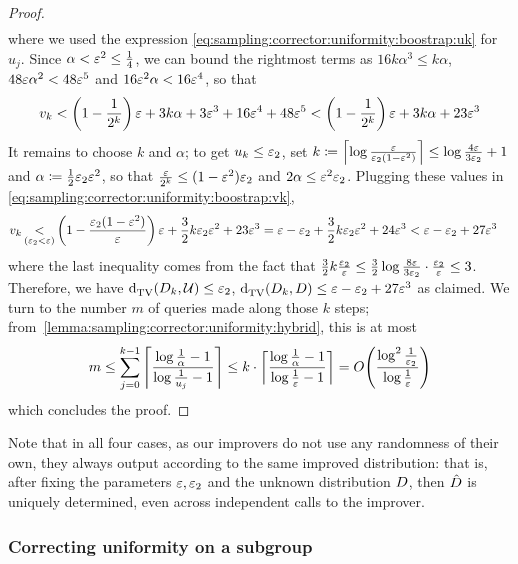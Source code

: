 \begin{proof}
\begin{align*}
\end{align*}
where we used the expression \eqref{eq:sampling:corrector:uniformity:boostrap:uk} for $u_j$. Since $\alpha < \varepsilon^2 \leq \frac{1}{4}$, we can bound the rightmost terms as $16k\alpha^3 \leq k\alpha$, $48\varepsilon\alpha^2<48\varepsilon^5$ and $16\varepsilon^2\alpha < 16\varepsilon^4$, so that 
\begin{equation}\label{eq:sampling:corrector:uniformity:boostrap:vk}
  v_k < \left( 1-\frac{1}{2^k} \right)\varepsilon + 3k\alpha + 3\varepsilon^3+16\varepsilon^4+48\varepsilon^5 < \left( 1-\frac{1}{2^k} \right)\varepsilon + 3k\alpha + 23\varepsilon^3
\end{equation}
It remains to choose $k$ and $\alpha$; to get $u_k \leq \varepsilon_2$, set $k\coloneqq\left\lceil \log\frac{\varepsilon}{\varepsilon_2(1-\varepsilon^2)} \right\rceil\leq \log\frac{4\varepsilon}{3\varepsilon_2}+1$ and $\alpha\coloneqq\frac{1}{2}\varepsilon_2\varepsilon^2$, so that $\frac{\varepsilon}{2^k}\leq (1-\varepsilon^2)\varepsilon_2$ and $2\alpha \leq \varepsilon^2\varepsilon_2$. Plugging these values in \eqref{eq:sampling:corrector:uniformity:boostrap:vk},
\begin{align*}
  v_k &\operatorname*{<}_{(\varepsilon_2<\varepsilon)} \left( 1-\frac{\varepsilon_2(1-\varepsilon^2)}{\varepsilon} \right)\varepsilon + \frac{3}{2}k\varepsilon_2\varepsilon^2 + 23\varepsilon^3 
    = \varepsilon - \varepsilon_2 + \frac{3}{2}k\varepsilon_2\varepsilon^2 + 24\varepsilon^3 
    < \varepsilon - \varepsilon_2 + 27\varepsilon^3
\end{align*}
where the last inequality comes from the fact that $\frac{3}{2}k\frac{\varepsilon_2}{\varepsilon} \leq \frac{3}{2}\log\frac{8\varepsilon}{3\varepsilon_2}\cdot\frac{\varepsilon_2}{\varepsilon}\leq 3$.
Therefore, we have ${\operatorname{d}_{\textrm{TV}}^{}\!\left({D_k, \mathcal{U}}\right)}\leq \varepsilon_2$, ${\operatorname{d}_{\textrm{TV}}^{}\!\left({D_k, D}\right)} \leq \varepsilon - \varepsilon_2 + 27\varepsilon^3$ as claimed. We turn to the number $m$ of queries made along those $k$ steps; from~\autoref{lemma:sampling:corrector:uniformity:hybrid}, this is at most
\begin{align*}
  m \leq \sum_{j=0}^{k-1} \clg{ \frac{\log\frac{1}{\alpha}-1}{\log\frac{1}{u_j}-1} } \leq k\cdot \clg{ \frac{\log\frac{1}{\alpha}-1}{\log\frac{1}{\eps}-1} }= \bigO{ \frac{\log^2\frac{1}{\eps_2}}{\log\frac{1}{\eps}} }
\end{align*}
which concludes the proof.
\end{proof}

Note that in all four cases, as our improvers do not use any randomness of their own, 
they always output according to the same improved distribution: that is, after fixing 
the parameters $\varepsilon, \varepsilon_2$ and the unknown distribution $D$, then $\hat{D}$ is 
uniquely determined, even across independent calls to the improver.
 
\subsubsection{Correcting uniformity on a subgroup}\label{sec:unif:subgroup}
